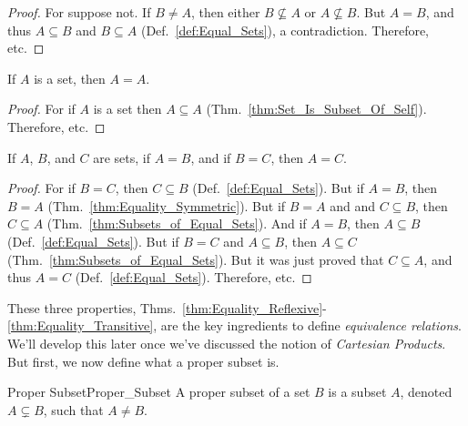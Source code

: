             \begin{proof}
                For suppose not. If $B\ne{A}$, then either
                $B\nsubseteq{A}$ or $A\nsubseteq{B}$.
                But $A=B$, and thus $A\subseteq{B}$  and
                $B\subseteq{A}$ (Def.~\ref{def:Equal_Sets}),
                a contradiction. Therefore, etc.
            \end{proof}
            \begin{theorem}
                \label{thm:Equality_Reflexive}%
                If $A$ is a set, then $A=A$.
            \end{theorem}
            \begin{proof}
                For if $A$ is a set then $A\subseteq{A}$
                (Thm.~\ref{thm:Set_Is_Subset_Of_Self}).
                Therefore, etc.
            \end{proof}
            \begin{theorem}
                \label{thm:Equality_Transitive}%
                If $A$, $B$, and $C$ are sets, if $A=B$, and if
                $B=C$, then $A=C$.
            \end{theorem}
            \begin{proof}
                For if $B=C$, then $C\subseteq{B}$
                (Def.~\ref{def:Equal_Sets}). But if
                $A=B$, then $B=A$
                (Thm.~\ref{thm:Equality_Symmetric}). But if
                $B=A$ and and $C\subseteq{B}$, then
                $C\subseteq{A}$
                (Thm.~\ref{thm:Subsets_of_Equal_Sets}).
                And if $A=B$, then $A\subseteq{B}$
                (Def.~\ref{def:Equal_Sets}). But if $B=C$ and
                $A\subseteq{B}$, then $A\subseteq{C}$
                (Thm.~\ref{thm:Subsets_of_Equal_Sets}). But it
                was just proved that $C\subseteq{A}$, and
                thus $A=C$ (Def.~\ref{def:Equal_Sets}).
                Therefore, etc.
            \end{proof}
            These three properties,
            Thms.~\ref{thm:Equality_Reflexive}-%
            \ref{thm:Equality_Transitive}, are the key
            ingredients to define \textit{equivalence relations}.
            We'll develop this later once we've discussed the
            notion of \textit{Cartesian Products}. But first, we
            now define what a proper subset is.
            \begin{ldefinition}{Proper Subset}{Proper_Subset}
                A \gls{proper subset} of a set $B$ is a
                subset $A$, denoted $A\subsetneq{B}$, such that
                $A\ne{B}$.
            \end{ldefinition}
